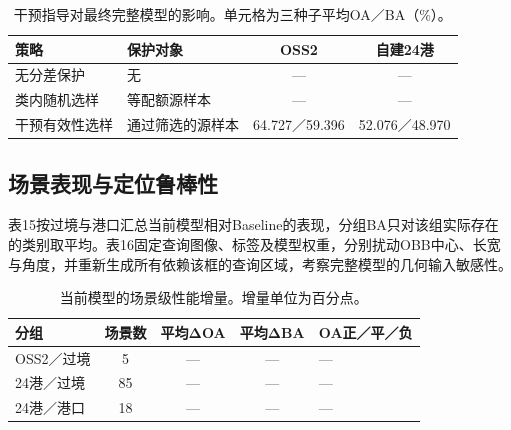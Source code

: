 \documentclass[journal,10pt,a4paper]{IEEEtran}
\begin{document}
\begin{table}[H]
\centering\footnotesize
\setcounter{table}{13}
\caption{干预指导对最终完整模型的影响。单元格为三种子平均OA／BA（\%）。}
\label{tab:14}
\setlength{\tabcolsep}{3pt}\renewcommand{\arraystretch}{1.2}
\begin{tabularx}{\linewidth}{LLCC}
\toprule
策略 & 保护对象 & OSS2 & 自建24港 \\
\midrule
无分差保护 & 无 & --- & --- \\
类内随机选样 & 等配额源样本 & --- & --- \\
干预有效性选样 & 通过筛选的源样本 & 64.727／59.396 & 52.076／48.970 \\
\bottomrule
\end{tabularx}
\end{table}

\subsection{场景表现与定位鲁棒性}\label{ux573aux666fux8868ux73b0ux4e0eux5b9aux4f4dux9c81ux68d2ux6027}

表15按过境与港口汇总当前模型相对Baseline的表现，分组BA只对该组实际存在的类别取平均。表16固定查询图像、标签及模型权重，分别扰动OBB中心、长宽与角度，并重新生成所有依赖该框的查询区域，考察完整模型的几何输入敏感性。

\begin{table}[H]
\centering\footnotesize
\setcounter{table}{14}
\caption{当前模型的场景级性能增量。增量单位为百分点。}
\label{tab:15}
\setlength{\tabcolsep}{3pt}\renewcommand{\arraystretch}{1.2}
\begin{tabularx}{\linewidth}{LCCCL}
\toprule
分组 & 场景数 & 平均ΔOA & 平均ΔBA & OA正／平／负 \\
\midrule
OSS2／过境 & 5 & --- & --- & --- \\
24港／过境 & 85 & --- & --- & --- \\
24港／港口 & 18 & --- & --- & --- \\
\bottomrule
\end{tabularx}
\end{table}
\end{document}
